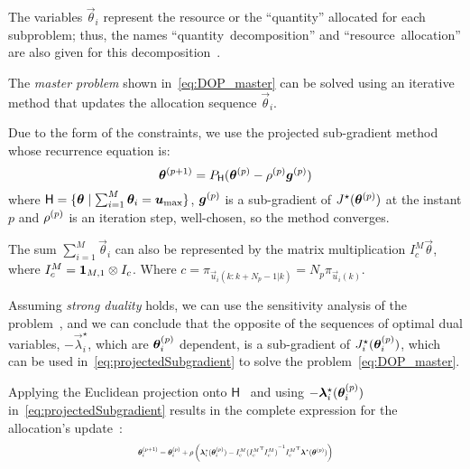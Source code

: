 \documentclass[a4paper, 10 pt, conference]{ieeeconf}  %
\begin{document}
The variables $\vec{\theta}_{i}$ represent the resource or the ``quantity'' allocated for each subproblem; thus, the names \mbox{``quantity decomposition''} and \mbox{``resource allocation''} are also given for this decomposition~\cite{Cohen1978}.

The \emph{master problem} shown in~\eqref{eq:DOP_master} can be solved using an iterative method that updates the allocation sequence $\vec{\theta}_{i}$.

Due to the form of the constraints, we use the projected sub-gradient method whose recurrence
equation is:
\begin{equation}
  \label{eq:projectedSubgradient}
\bm{\theta}^{(p+1)}=P_{\mathsf{H}}(\bm{\theta}^{(p)}-\rho^{(p)}\bm{g}^{(p)})
\end{equation}
where ${\mathsf{H} = \{\bm{\theta}\mathrel{}\mid\mathrel{}\sum_{i=1}^{M}\bm{\theta}_{i}=\bm{u}_{\max}\}}$, $\bm{g}^{(p)}$ is a sub-gradient of $J^{\star}(\bm{\theta}^{(p)})$ at the instant $p$ and $\rho^{(p)}$ is an iteration step, well-chosen, so the method converges.

The sum $\sum_{i=1}^{M}\vec{\theta}_{i}$ can also be represented by the matrix multiplication $I_{c}^{M}\vec{\theta}$, where ${I_{c}^{M}=\mathbf{1}_{M,1}\otimes I_{c}}$. Where ${c=\pi_{\vec{u}_{i}(k:k+N_{p}-1|k)}=N_{p}\pi_{\vec{u}_{i}(k)}}$.

Assuming \emph{strong duality} holds, we can use the sensitivity analysis of the problem~\cite[\S~5.6.2]{BoydVandenberghe2004}, and we can conclude that the opposite of the sequences of optimal dual variables, $-\vec{\lambda}^{\star}_{i}$, which are $\bm{\theta}_{i}^{(p)}$ dependent, is a sub-gradient of $J_{i}^{\star}(\bm{\theta}_{i}^{(p)})$, which can be used in~\eqref{eq:projectedSubgradient} to solve the problem~\eqref{eq:DOP_master}.

Applying the Euclidean projection onto $\mathsf{H}$~\cite{Ouyang2020} and using $-\bm{\lambda}_{i}^{\star}(\bm{\theta}_{i}^{(p)})$ in~\eqref{eq:projectedSubgradient} results in the complete expression for the allocation's update~\cite[\S VI-C]{Cohen1978}:
\begin{equation}
  \label{eq:thetaNegot}
  \resizebox{0.45\textwidth}{!}{$
  \begin{aligned}
\vec{\theta}_{i}\pplusone=\vec{\theta}_{i}\p+\rho\left(\vec{\lambda}_{i}^{\star}(\vec{\theta}_{i}\p)-I_{c}^{M}{({I_{c}^{M}}\T I_{c}^{M})}^{-1}{I_{c}^{M}}\T \vec{\lambda}^{\star}(\vec{\theta}\p)\right)
  \end{aligned}$}
\end{equation}
\end{document}
